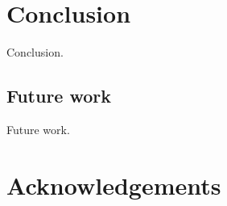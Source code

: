 
\section{Conclusion}

Conclusion.

\subsection{Future work}

Future work.

\section{Acknowledgements}


